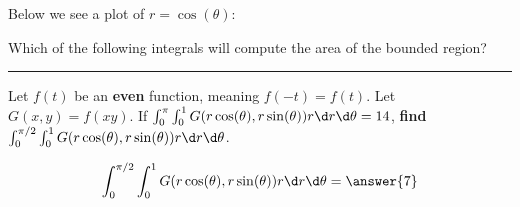 \documentclass{ximera}
\begin{document}
\begin{problem}
  Below we see a plot of $r = \cos(\theta)$:
  \begin{image}[2in]
\end{image}
Which of the following integrals will compute the area of the bounded region?
\begin{selectAll}
\end{selectAll}
\end{problem}

\hrule

\begin{problem}
  Let $f(t)$ be an \textbf{even} function, meaning $f(-t) = f(t)$. Let $G(x,y)
  = f(xy)$. If $\int_{0}^{\pi} \int_0^1 G(r \cos(\theta),r\sin(\theta))r\d r\d\theta = 14$, \textbf{find}  $\int_{0}^{\pi/2} \int_0^1 G(r \cos(\theta),r\sin(\theta))r\d r\d\theta$.
  \begin{prompt}
  \[
  \int_{0}^{\pi/2} \int_0^1 G(r \cos(\theta),r\sin(\theta))r\d r\d\theta = \answer{7}
  \]
  \end{prompt}
\end{problem}

\vfill
\end{document}

